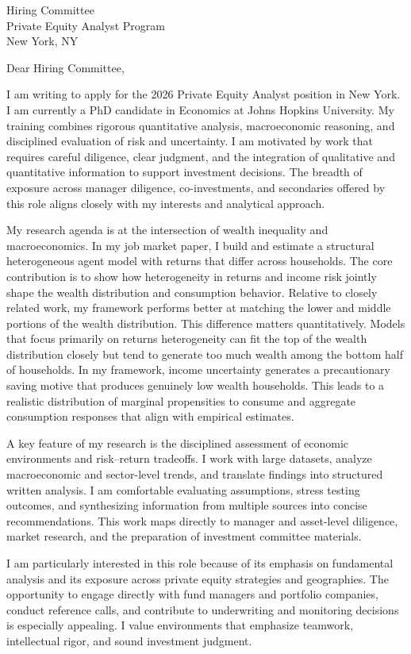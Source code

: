 \documentclass[11pt]{letter}
\begin{document}
\begin{letter}{Hiring Committee \\ Private Equity Analyst Program \\ New York, NY}

\opening{Dear Hiring Committee,}

I am writing to apply for the 2026 Private Equity Analyst position in New York. I am currently a PhD candidate in Economics at Johns Hopkins University. My training combines rigorous quantitative analysis, macroeconomic reasoning, and disciplined evaluation of risk and uncertainty. I am motivated by work that requires careful diligence, clear judgment, and the integration of qualitative and quantitative information to support investment decisions. The breadth of exposure across manager diligence, co-investments, and secondaries offered by this role aligns closely with my interests and analytical approach.

My research agenda is at the intersection of wealth inequality and macroeconomics. In my job market paper, I build and estimate a structural heterogeneous agent model with returns that differ across households. The core contribution is to show how heterogeneity in returns and income risk jointly shape the wealth distribution and consumption behavior. Relative to closely related work, my framework performs better at matching the lower and middle portions of the wealth distribution. This difference matters quantitatively. Models that focus primarily on returns heterogeneity can fit the top of the wealth distribution closely but tend to generate too much wealth among the bottom half of households. In my framework, income uncertainty generates a precautionary saving motive that produces genuinely low wealth households. This leads to a realistic distribution of marginal propensities to consume and aggregate consumption responses that align with empirical estimates.

A key feature of my research is the disciplined assessment of economic environments and risk–return tradeoffs. I work with large datasets, analyze macroeconomic and sector-level trends, and translate findings into structured written analysis. I am comfortable evaluating assumptions, stress testing outcomes, and synthesizing information from multiple sources into concise recommendations. This work maps directly to manager and asset-level diligence, market research, and the preparation of investment committee materials.

I am particularly interested in this role because of its emphasis on fundamental analysis and its exposure across private equity strategies and geographies. The opportunity to engage directly with fund managers and portfolio companies, conduct reference calls, and contribute to underwriting and monitoring decisions is especially appealing. I value environments that emphasize teamwork, intellectual rigor, and sound investment judgment.


\end{letter}
\end{document}
